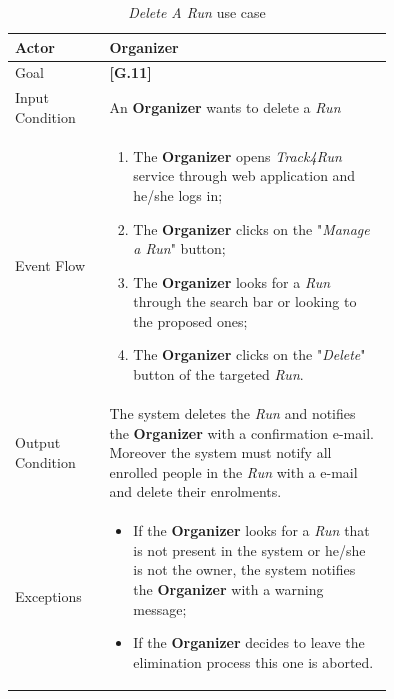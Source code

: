 \begin{center}
\begin{table}
\begin{tabular}{ | l | p{0.75\linewidth} | }
  \hline
    Actor & \textbf{Organizer} \\ \hline
    Goal & \textbf{[G.11]} \\ \hline
    Input Condition & An \textbf{Organizer} wants to delete a \textit{Run} \\ \hline
    Event Flow & \begin{minipage}[t]{0.7\textwidth}
      \begin{enumerate}
        \item The \textbf{Organizer} opens \textit{Track4Run} service through web application and he/she logs in;
        \item The \textbf{Organizer} clicks on the "\textit{Manage a Run}" button;
        \item The \textbf{Organizer} looks for a \textit{Run} through the search bar or looking to the proposed ones;
        \item The \textbf{Organizer} clicks on the "\textit{Delete}" button of the targeted \textit{Run}.
      \end{enumerate}
    \smallskip
  \end{minipage} \\ \hline
  Output Condition & The system deletes the \textit{Run} and notifies the \textbf{Organizer} with a confirmation e-mail. Moreover the system must notify all enrolled people in the \textit{Run} with a e-mail and delete their enrolments. \\ \hline
  Exceptions & \begin{minipage}[t]{0.7\textwidth}
    \begin{itemize}
      \smallskip
      \item If the \textbf{Organizer} looks for a \textit{Run} that is not present in the system or he/she is not the owner, the system notifies the \textbf{Organizer} with a warning message;
      \item If the \textbf{Organizer} decides to leave the elimination process this one is aborted.
    \end{itemize}
    \smallskip
  \end{minipage}  \\ \hline
\end{tabular}
\caption{\textit{Delete A Run} use case}
\label{table:deleteRunTable}
\end{table}
\end{center}

